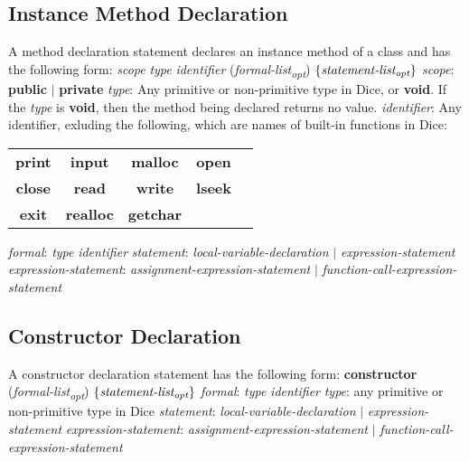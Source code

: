 \begin{homeworkProblem}
    \subsection{Instance Method Declaration}
    A method declaration statement declares an instance method of a class and has the following form:
    \newline
    \textit{scope} \textit{type} \textit{identifier} (\textit{formal-list\textsubscript{opt}}) $\left\{ \textit{statement-list\textsubscript{opt}} \right\}$
    \newline
    \textit{scope}: \textbf{public} $|$ \textbf{private}
    \newline
    \textit{type}: Any primitive or non-primitive type in Dice, or \textbf{void}. If the \textit{type} is \textbf{void}, then the method being declared returns no value.
    \newline
    \textit{identifier}: Any identifier, exluding the following, which are names of built-in functions in Dice:
    \newline
    \begin{center}
    \begin{tabular}{ccccc}
    \textbf{print} & \textbf{input} & \textbf{malloc} & \textbf{open} \\
    \textbf{close} & \textbf{read} & \textbf{write} & \textbf{lseek} \\
    \textbf{exit} & \textbf{realloc} & \textbf{getchar}
    \end{tabular}
    \end{center}
    \textit{formal}: \textit{type} \textit{identifier}
    \newline
    \textit{statement}: \textit{local-variable-declaration} $|$ \textit{expression-statement}
    \newline
    \textit{expression-statement}: \textit{assignment-expression-statement} $|$ \textit{function-call-expression-statement}

    \subsection{Constructor Declaration}
    A constructor declaration statement has the following form:
    \newline
    \textbf{constructor} (\textit{formal-list\textsubscript{opt}}) $\left\{ \textit{statement-list\textsubscript{opt}} \right\}$
    \newline
    \textit{formal}: \textit{type} \textit{identifier}
    \newline
    \textit{type}: any primitive or non-primitive type in Dice
    \newline
    \textit{statement}: \textit{local-variable-declaration} $|$ \textit{expression-statement}
    \newline
    \textit{expression-statement}: \textit{assignment-expression-statement} $|$ \textit{function-call-expression-statement}


\end{homeworkProblem}
